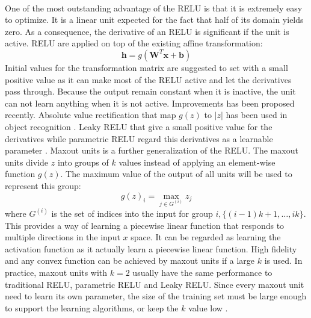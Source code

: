 \paragraph{}
One of the most outstanding advantage of the RELU is that it is extremely easy to optimize.
It is a linear unit expected for the fact that half of its domain yields zero.
As a consequence, the derivative of an RELU is significant if the unit is active.
RELU are applied on top of the existing affine transformation:
\begin{equation}
    \mathbf{h} = g( \mathbf{W}^T \mathbf{x} + \mathbf{b})
\end{equation}
%
Initial values for the transformation matrix are suggested to set with a small positive value as it can make most of the RELU active and let the derivatives pass through.
Because the output remain constant when it is inactive, the unit can not learn anything when it is not active.
Improvements has been proposed recently.
Absolute value rectification that map $g(z)$ to $|z|$ has been used in object recognition \citep{jarret2009}.
Leaky RELU that give a small positive value for the derivatives \citep{maas2013} while parametric RELU regard this derivatives as a learnable parameter \citep{He2015}.
Maxout units \citep{Goodfellow2013} is a further generalization of the RELU.
The maxout units divide $z$ into groups of $k$ values instead of applying an element-wise function $g(z)$.
The maximum value of the output of all units will be used to represent this group:
\begin{equation}
    g(z)_i = \max_{j\in G^{(i)}} z_j
\end{equation}
%
where $G^{(i)}$ is the set of indices into the input for group $i, \{(i-1)k+1, \dots, ik \}$.
This provides a way of learning a piecewise linear function that responds to multiple directions in the input $x$ space.
It can be regarded as learning the activation function as it actually learn a piecewise linear function.
High fidelity and any convex function can be achieved by maxout units if a large $k$ is used.
In practice, maxout units with $k=2$ usually have the same performance to traditional RELU, parametric RELU and Leaky RELU.
Since every maxout unit need to learn its own parameter, the size of the training set must be large enough to support the learning algorithms, or keep the $k$ value low \citep{Cai2013}.





